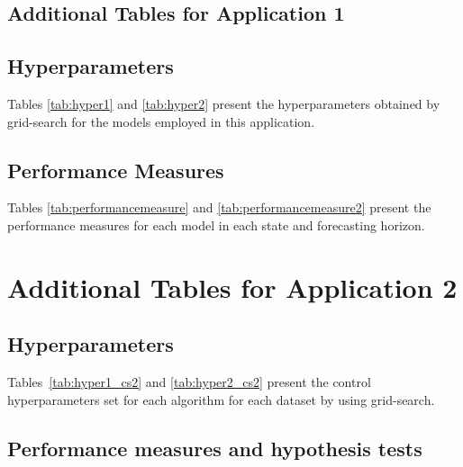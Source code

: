 \begin{apendicesenv}

\begin{landscape}
\chapter{Additional Tables for Application 1}
\setcounter{table}{0}
\renewcommand{\thetable}{A\arabic{table}}
\section*{Hyperparameters \label{app:cs1_appendixA}}

Tables \ref{tab:hyper1} and \ref{tab:hyper2} present the hyperparameters obtained by grid-search for the models employed in this application.



\section*{Performance Measures \label{cs1_appendixB}}

Tables \ref{tab:performancemeasure} and \ref{tab:performancemeasure2} present the performance measures for each model in each state and forecasting horizon.


\end{landscape}

\chapter{Additional Tables for Application 2}
\setcounter{table}{0}
\renewcommand{\thetable}{B\arabic{table}}

\section*{Hyperparameters \label{app:hyper}}
Tables~\ref{tab:hyper1_cs2} and \ref{tab:hyper2_cs2} present the control hyperparameters set for each algorithm for each dataset by using grid-search. 



\begin{landscape}
\section*{Performance measures and hypothesis tests}


\end{landscape}
\end{apendicesenv}
